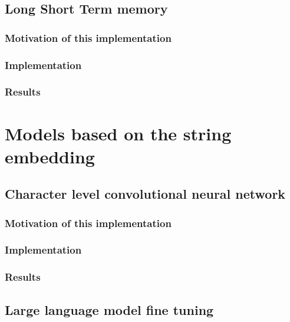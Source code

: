 \documentclass{article}
\begin{document}
    \subsection{Long Short Term memory}\label{subsec:long-short-term-memory}

    \subsubsection{Motivation of this implementation}

    \subsubsection{Implementation}

    \subsubsection{Results}


    \section{Models based on the string embedding}\label{sec:models-based-on-the-string-embedding}

    \subsection{Character level convolutional neural network}\label{subsec:character-level-convolutional-neural-network}

    \subsubsection{Motivation of this implementation}

    \subsubsection{Implementation}

    \subsubsection{Results}

    \subsection{Large language model fine tuning}\label{subsec:large-language-model-finetuning}
\end{document}
